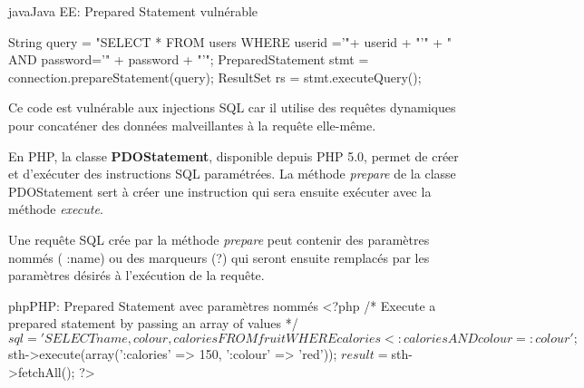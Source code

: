 \begin{Config}{java}{Java EE: Prepared Statement vulnérable}

String query = 
	"SELECT * FROM users WHERE userid ='"+ userid + "'" + " AND password='" + password + "'";
PreparedStatement stmt = connection.prepareStatement(query);
ResultSet rs = stmt.executeQuery();

\end{Config}	

Ce code est vulnérable aux injections SQL car il utilise des requêtes dynamiques pour concaténer des données malveillantes à la requête elle-même. \newline\newline


En PHP, la classe \textbf{PDOStatement}, disponible depuis PHP 5.0, permet de créer et d’exécuter des instructions SQL paramétrées.
La méthode \textit{prepare} de la classe PDOStatement sert à créer une instruction qui sera ensuite exécuter avec la méthode \textit{execute}.

Une requête SQL crée par la méthode \textit{prepare} peut contenir des paramètres nommés ( :name) ou des marqueurs (?) qui seront ensuite remplacés par les paramètres désirés à l’exécution de la requête.

\begin{Config}{php}{PHP: Prepared Statement avec paramètres nommés}
<?php
/* Execute a prepared statement by passing an array of values */
$sql = 'SELECT name, colour, calories
    FROM fruit
    WHERE calories < :calories AND colour = :colour';
$sth->execute(array(':calories' => 150, ':colour' => 'red'));
$result = $sth->fetchAll();
?>
\end{Config}


